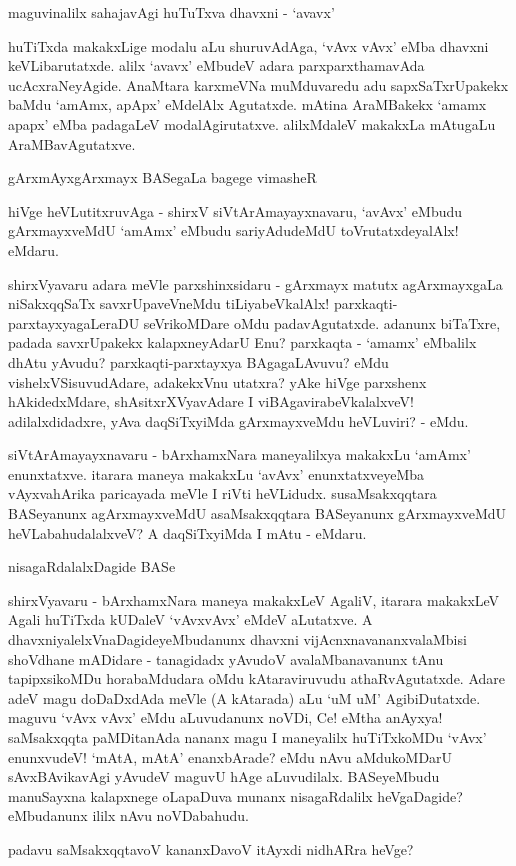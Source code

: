 maguvinalilx sahajavAgi huTuTxva dhavxni - `avavx'

huTiTxda makakxLige modalu aLu shuruvAdAga, `vAvx vAvx' eMba dhavxni keVLibarutatxde. alilx `avavx' eMbudeV adara parxparxthamavAda ucAcxraNeyAgide. AnaMtara karxmeVNa muMduvaredu adu sapxSaTxrUpakekx baMdu `amAmx, apApx' eMdelAlx Agutatxde. mAtina AraMBakekx `amamx apapx' eMba padagaLeV modalAgirutatxve. alilxMdaleV makakxLa mAtugaLu AraMBavAgutatxve. 

gArxmAyxgArxmayx BASegaLa bagege vimasheR

hiVge heVLutitxruvAga - shirxV siVtArAmayayxnavaru, `avAvx' eMbudu gArxmayxveMdU `amAmx' eMbudu sariyAdudeMdU toVrutatxdeyalAlx! eMdaru.

shirxVyavaru adara meVle parxshinxsidaru - gArxmayx matutx agArxmayxgaLa niSakxqqSaTx savxrUpaveVneMdu tiLiyabeVkalAlx! parxkaqti-parxtayxyagaLeraDU seVrikoMDare oMdu padavAgutatxde. adanunx biTaTxre, padada savxrUpakekx kalapxneyAdarU Enu? parxkaqta - `amamx' eMbalilx dhAtu yAvudu? parxkaqti-parxtayxya BAgagaLAvuvu? eMdu vishelxVSisuvudAdare, adakekxVnu utatxra? yAke hiVge parxshenx hAkidedxMdare, shAsitxrXVyavAdare I viBAgavirabeVkalalxveV! adilalxdidadxre, yAva daqSiTxyiMda gArxmayxveMdu heVLuviri? - eMdu.

siVtArAmayayxnavaru - bArxhamxNara maneyalilxya makakxLu `amAmx' enunxtatxve. itarara maneya makakxLu `avAvx' enunxtatxveyeMba vAyxvahArika paricayada meVle I riVti heVLidudx. susaMsakxqqtara BASeyanunx agArxmayxveMdU asaMsakxqqtara BASeyanunx gArxmayxveMdU heVLabahudalalxveV? A daqSiTxyiMda I mAtu - eMdaru.

nisagaRdalalxDagide BASe

shirxVyavaru - bArxhamxNara maneya makakxLeV AgaliV, itarara makakxLeV Agali huTiTxda kUDaleV `vAvxvAvx' eMdeV aLutatxve. A dhavxniyalelxVnaDagideyeMbudanunx dhavxni vijAcnxnavananxvalaMbisi shoVdhane mADidare - tanagidadx yAvudoV avalaMbanavanunx tAnu tapipxsikoMDu horabaMdudara oMdu kAtaraviruvudu athaRvAgutatxde. Adare adeV magu doDaDxdAda meVle (A kAtarada) aLu `uM uM' AgibiDutatxde. maguvu `vAvx vAvx' eMdu aLuvudanunx noVDi, Ce! eMtha anAyxya! saMsakxqqta paMDitanAda nananx magu I maneyalilx huTiTxkoMDu `vAvx' enunxvudeV! `mAtA, mAtA' enanxbArade? eMdu nAvu aMdukoMDarU sAvxBAvikavAgi yAvudeV maguvU hAge aLuvudilalx. BASeyeMbudu manuSayxna kalapxnege oLapaDuva munanx nisagaRdalilx heVgaDagide? eMbudanunx ililx nAvu noVDabahudu.

padavu saMsakxqqtavoV kananxDavoV itAyxdi nidhARra heVge?

